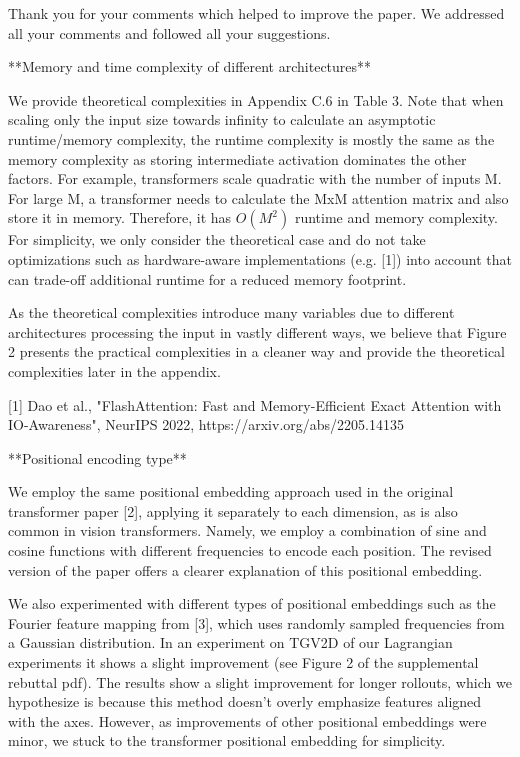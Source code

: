 Thank you for your comments which helped to improve the paper. We addressed all your comments and followed all your suggestions.

**Memory and time complexity of different architectures**


We provide theoretical complexities in Appendix C.6 in Table 3. Note that when scaling only the input size towards infinity to calculate an asymptotic runtime/memory complexity, the runtime complexity is mostly the same as the memory complexity as storing intermediate activation dominates the other factors. For example, transformers scale quadratic with the number of inputs M. For large M, a transformer needs to calculate the MxM attention matrix and also store it in memory. Therefore, it has $O(M^2)$ runtime and memory complexity.
For simplicity, we only consider the theoretical case and do not take optimizations such as hardware-aware implementations (e.g. [1]) into account that can trade-off additional runtime for a reduced memory footprint.

As the theoretical complexities introduce many variables due to different architectures processing the input in vastly different ways, we believe that Figure 2 presents the practical complexities in a cleaner way and provide the theoretical complexities later in the appendix.

[1] Dao et al., "FlashAttention: Fast and Memory-Efficient Exact Attention with IO-Awareness", NeurIPS 2022, https://arxiv.org/abs/2205.14135



**Positional encoding type**



We employ the same positional embedding approach used in the original transformer paper [2], applying it separately to each dimension, as is also common in vision transformers. Namely, we employ a combination of sine and cosine functions with different frequencies to encode each position. The revised version of the paper offers a clearer explanation of this positional embedding.

We also experimented with different types of positional embeddings such as the Fourier feature mapping from [3], which uses randomly sampled frequencies from a Gaussian distribution. In an experiment on TGV2D of our Lagrangian experiments it shows a slight improvement (see Figure 2 of the supplemental rebuttal pdf). The results show a slight improvement for longer rollouts, which we hypothesize is because this method doesn't overly emphasize features aligned with the axes. However, as improvements of other positional embeddings were minor, we stuck to the transformer positional embedding for simplicity.


